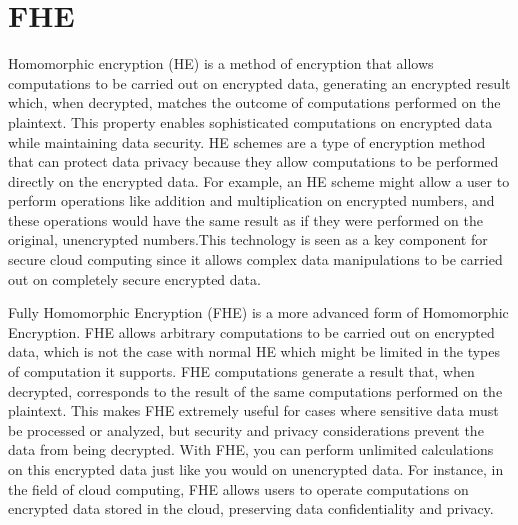\documentclass[11pt]{article}
\begin{document}
\section{FHE}
Homomorphic encryption (HE) is a method of encryption that allows computations to be carried out on encrypted data, generating an encrypted result which, when decrypted, matches the outcome of computations performed on the plaintext. This property enables sophisticated computations on encrypted data while maintaining data security. HE schemes are a type of encryption method that can protect data privacy because they allow computations to be performed directly on the encrypted data. For example, an HE scheme might allow a user to perform operations like addition and multiplication on encrypted numbers, and these operations would have the same result as if they were performed on the original, unencrypted numbers.This technology is seen as a key component for secure cloud computing since it allows complex data manipulations to be carried out on completely secure encrypted data.

Fully Homomorphic Encryption (FHE) is a more advanced form of Homomorphic Encryption. FHE allows arbitrary computations to be carried out on encrypted data, which is not the case with normal HE which might be limited in the types of computation it supports.
FHE computations generate a result that, when decrypted, corresponds to the result of the same computations performed on the plaintext. This makes FHE extremely useful for cases where sensitive data must be processed or analyzed, but security and privacy considerations prevent the data from being decrypted. With FHE, you can perform unlimited calculations on this encrypted data just like you would on unencrypted data. For instance, in the field of cloud computing, FHE allows users to operate computations on encrypted data stored in the cloud, preserving data confidentiality and privacy.
\end{document}

